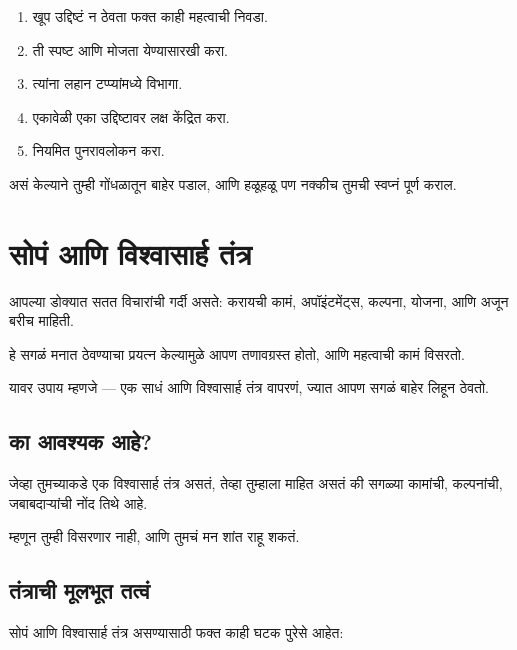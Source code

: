 \begin{enumerate}
\item खूप उद्दिष्टं न ठेवता फक्त काही महत्वाची निवडा.  
\item ती स्पष्ट आणि मोजता येण्यासारखी करा.  
\item त्यांना लहान टप्प्यांमध्ये विभागा.  
\item एकावेळी एका उद्दिष्टावर लक्ष केंद्रित करा.  
\item नियमित पुनरावलोकन करा.  
\end{enumerate}

असं केल्याने तुम्ही गोंधळातून बाहेर पडाल,  
आणि हळूहळू पण नक्कीच तुमची स्वप्नं पूर्ण कराल.  


\chapter{सोपं आणि विश्वासार्ह तंत्र}

आपल्या डोक्यात सतत विचारांची गर्दी असते:  
करायची कामं, अपॉइंटमेंट्स, कल्पना, योजना,  
आणि अजून बरीच माहिती.  

हे सगळं मनात ठेवण्याचा प्रयत्न केल्यामुळे  
आपण तणावग्रस्त होतो,  
आणि महत्वाची कामं विसरतो.  

यावर उपाय म्हणजे —  
एक साधं आणि विश्वासार्ह तंत्र वापरणं,  
ज्यात आपण सगळं बाहेर लिहून ठेवतो.  

\section*{का आवश्यक आहे?}
जेव्हा तुमच्याकडे एक विश्वासार्ह तंत्र असतं,  
तेव्हा तुम्हाला माहित असतं की  
सगळ्या कामांची, कल्पनांची, जबाबदाऱ्यांची नोंद तिथे आहे.  

म्हणून तुम्ही विसरणार नाही,  
आणि तुमचं मन शांत राहू शकतं.  

\section*{तंत्राची मूलभूत तत्वं}
सोपं आणि विश्वासार्ह तंत्र असण्यासाठी फक्त काही घटक पुरेसे आहेत:  

